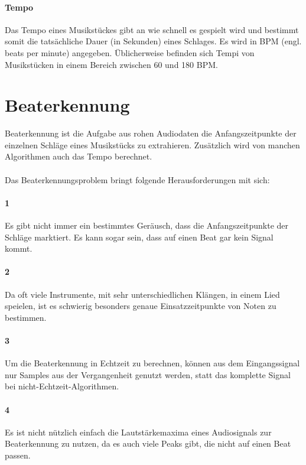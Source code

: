 {	\paragraph{Tempo}
	{
		Das Tempo eines Musikstückes gibt an wie schnell es gespielt wird
			und bestimmt somit die tatsächliche Dauer (in Sekunden) eines Schlages.
		Es wird in BPM (engl. beats per minute) angegeben.
		Üblicherweise befinden sich Tempi von Musikstücken in einem Bereich zwischen 60 und 180 BPM.
	}
}

\section{Beaterkennung}
{
	Beaterkennung ist die Aufgabe aus rohen Audiodaten die Anfangszeitpunkte der einzelnen Schläge eines Musikstücks zu extrahieren.
	Zusätzlich wird von manchen Algorithmen auch das Tempo berechnet.

	\paragraph{}
	{
		Das Beaterkennungsproblem bringt folgende Herausforderungen mit sich:
	}

	\paragraph{1} %
	{
		Es gibt nicht immer ein bestimmtes Geräusch,
			dass die Anfangszeitpunkte der Schläge marktiert.
		Es kann sogar sein, dass auf einen Beat gar kein Signal kommt.
	}

	\paragraph{2} %
	{
		Da oft viele Instrumente, mit sehr unterschiedlichen Klängen, in einem Lied speielen,
			ist es schwierig besonders genaue Einsatzzeitpunkte von Noten zu bestimmen.
	}

	\paragraph{3} %
	{
		Um die Beaterkennung in Echtzeit zu berechnen,
			können aus dem Eingangssignal nur Samples aus der Vergangenheit genutzt werden,
			statt das komplette Signal bei nicht-Echtzeit-Algorithmen.
	}

	\paragraph{4} %
	{
		Es ist nicht nützlich einfach die Lautstärkemaxima eines Audiosignals zur Beaterkennung zu nutzen,
			da es auch viele Peaks gibt,
			die nicht auf einen Beat passen.
	}

}

